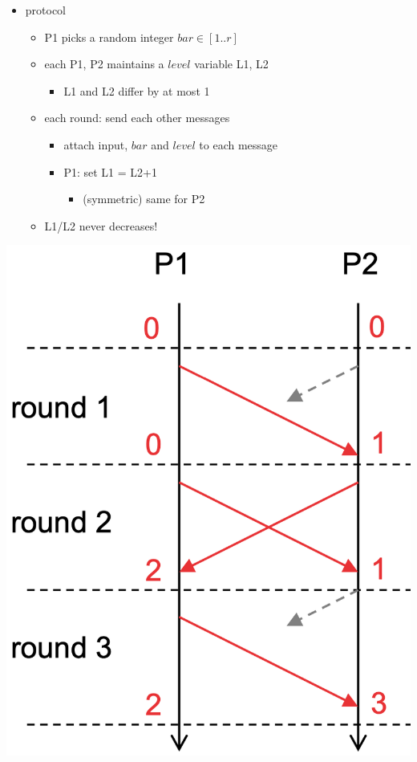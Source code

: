 \documentclass[10pt, landscape]{article}
\begin{document}
\begin{multicols*}{3}
  \begin{minipage}[c]{0.73\linewidth}\color{black}
    \begin{itemize}
      \item protocol
        \begin{itemize}
          \item P1 picks a random integer $bar \in [1..r]$
          \item each P1, P2 maintains a $level$ variable L1, L2
            \begin{itemize}
              \item L1 and L2 differ by at most 1
            \end{itemize}
          \item each round: send each other messages
            \begin{itemize}
              \item attach input, $bar$ and $level$ to each message
              \item P1: set L1 = L2+1
                \begin{itemize}
                  \item (symmetric) same for P2
                \end{itemize}
            \end{itemize}
          \item \attention L1/L2 never decreases!
        \end{itemize}
    \end{itemize}
  \end{minipage}
  \begin{minipage}[c]{0.24\linewidth}
    \includegraphics[width=\linewidth]{cs4231-distributedconsensus-level-algo.png} 

\end{minipage}
\end{multicols*}
\end{document}
